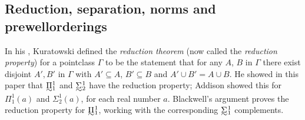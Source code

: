 \documentclass{book}%
\newcommand{\breals}{{^{\omega}}\omega}
\def\underTilde#1{{\baselineskip=0pt\vtop{\hbox{$#1$}\hbox{$\sim$}}}{}}
\newcommand{\uTPi}{\underTilde{\Pi}}
\newcommand{\uTSigma}{\underTilde{\Sigma}}
\begin{document}

\subsection{Reduction, separation, norms and prewellorderings}

In his , Kuratowski defined the \emph{reduction theorem}
(now called the \emph{reduction property})
for a pointclass $\Gamma$ to be the statement that for any $A$, $B$ in $\Gamma$ there exist
disjoint $A', B'$ in $\Gamma$ with $A' \subseteq A$, $B' \subseteq B$ and $A' \cup
B' = A \cup B$.  He showed in this paper that $\uTPi^{1}_{1}$
and $\uTSigma^{1}_{2}$ have the reduction property; Addison  showed this for
$\Pi^{1}_{1}(a)$ and $\Sigma^{1}_{2}(a)$, for each real number $a$.
Blackwell's argument proves the reduction property for $\uTPi^{1}_{1}$, working with the corresponding $\uTSigma^{1}_{1}$ complements.

\end{document}
